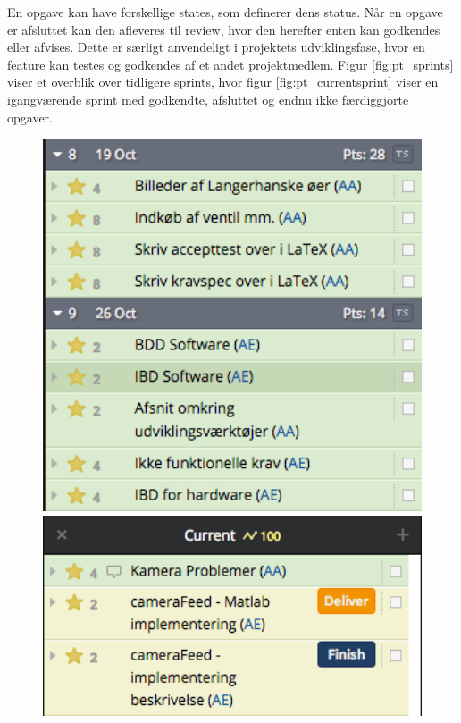 En opgave kan have forskellige states, som definerer dens status. Når en opgave er afsluttet kan den afleveres til review, hvor den herefter enten kan godkendes eller afvises. Dette er særligt anvendeligt i projektets udviklingsfase, hvor en feature kan testes og godkendes af et andet projektmedlem. Figur \ref{fig:pt_sprints}  viser et overblik over tidligere sprints, hvor figur \ref{fig:pt_currentsprint} viser en igangværende sprint med godkendte, afsluttet og endnu ikke færdiggjorte opgaver.

\begin{figure}[htbp] \centering
\begin{minipage}[b]{0.48\textwidth} \centering
\includegraphics[width=1.00\textwidth]{billeder/pt_previous_sprints} %
\end{minipage} \hfill
\begin{minipage}[b]{0.48\textwidth} \centering
\includegraphics[width=1.00\textwidth]{billeder/pt_current_sprint} %

\end{minipage}
\end{figure}
